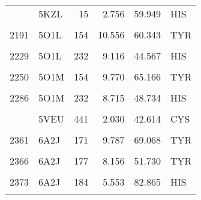 \begin{table}
\begin{tabular}{llrrrl}
			\addlinespace
			2161 & 5KZL & 15 & 2.756 & 59.949 & HIS\\
			\cellcolor{gray!6}{2190} & \cellcolor{gray!6}{5O1L} & \cellcolor{gray!6}{153} & \cellcolor{gray!6}{9.769} & \cellcolor{gray!6}{76.368} & \cellcolor{gray!6}{TYR}\\
			2191 & 5O1L & 154 & 10.556 & 60.343 & TYR\\
			\cellcolor{gray!6}{2213} & \cellcolor{gray!6}{5O1L} & \cellcolor{gray!6}{198} & \cellcolor{gray!6}{2.803} & \cellcolor{gray!6}{66.467} & \cellcolor{gray!6}{HIS}\\
			2229 & 5O1L & 232 & 9.116 & 44.567 & HIS\\
			\addlinespace
			\cellcolor{gray!6}{2249} & \cellcolor{gray!6}{5O1M} & \cellcolor{gray!6}{153} & \cellcolor{gray!6}{9.343} & \cellcolor{gray!6}{70.903} & \cellcolor{gray!6}{TYR}\\
			2250 & 5O1M & 154 & 9.770 & 65.166 & TYR\\
			\cellcolor{gray!6}{2271} & \cellcolor{gray!6}{5O1M} & \cellcolor{gray!6}{198} & \cellcolor{gray!6}{2.839} & \cellcolor{gray!6}{64.463} & \cellcolor{gray!6}{HIS}\\
			2286 & 5O1M & 232 & 8.715 & 48.734 & HIS\\
			\cellcolor{gray!6}{2318} & \cellcolor{gray!6}{5VEU} & \cellcolor{gray!6}{307} & \cellcolor{gray!6}{6.114} & \cellcolor{gray!6}{62.140} & \cellcolor{gray!6}{TYR}\\
			\addlinespace
			2345 & 5VEU & 441 & 2.030 & 42.614 & CYS\\
			\cellcolor{gray!6}{2357} & \cellcolor{gray!6}{6A2J} & \cellcolor{gray!6}{123} & \cellcolor{gray!6}{10.183} & \cellcolor{gray!6}{45.992} & \cellcolor{gray!6}{HIS}\\
			2361 & 6A2J & 171 & 9.787 & 69.068 & TYR\\
			\cellcolor{gray!6}{2363} & \cellcolor{gray!6}{6A2J} & \cellcolor{gray!6}{173} & \cellcolor{gray!6}{11.472} & \cellcolor{gray!6}{28.364} & \cellcolor{gray!6}{TYR}\\
			2366 & 6A2J & 177 & 8.156 & 51.730 & TYR\\
			\addlinespace
			\cellcolor{gray!6}{2370} & \cellcolor{gray!6}{6A2J} & \cellcolor{gray!6}{181} & \cellcolor{gray!6}{6.110} & \cellcolor{gray!6}{82.785} & \cellcolor{gray!6}{TYR}\\
			2373 & 6A2J & 184 & 5.553 & 82.865 & HIS\\
			\cellcolor{gray!6}{2378} & \cellcolor{gray!6}{6A2J} & \cellcolor{gray!6}{191} & \cellcolor{gray!6}{12.388} & \cellcolor{gray!6}{81.985} & \cellcolor{gray!6}{CYS}\\

\end{tabular}
\end{table}
